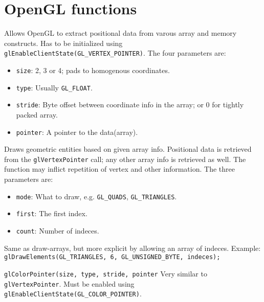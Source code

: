 \documentclass[a4paper, english, 12pt]{article}
\begin{document}


\section{OpenGL functions}
\label{sec:functions}

\begin{description}
	\item[\texttt{glVertexPointer(size, type, stride, pointer)}] Allows OpenGL to extract positional data from varous array and memory constructs. Has to be initialized using \texttt{glEnableClientState(GL\_VERTEX\_POINTER)}. The four parameters are:
	 \begin{itemize}[noitemsep]
		\item \texttt{size}: 2, 3 or 4; pads to homogenous coordinates.
		\item \texttt{type}: Usually \texttt{GL\_FLOAT}.
		\item \texttt{stride}: Byte offset between coordinate info in the array; or 0 for tightly packed array.
		\item \texttt{pointer}: A pointer to the data(array).
	\end{itemize}
	
	\item[\texttt{glDrawArrays(mode, first, count}] Draws geometric entities based on given array info. Positional data is retrieved from the \texttt{glVertexPointer} call; any other array info is retrieved as well. The function may inflict repetition of vertex and other information. The three parameters are:
	\begin{itemize}[noitemsep]
		\item \texttt{mode}: What to draw, e.g. \texttt{GL\_QUADS}, \texttt{GL\_TRIANGLES}.
		\item \texttt{first}: The first index.
		\item \texttt{count}: Number of indeces.
	\end{itemize}
	
	\item [\texttt{glDrawElements(mode, count, type, indeces}] Same as draw-arrays, but more explicit by allowing an array of indeces. Example: \texttt{glDrawElements(GL\_TRIANGLES, 6, GL\_UNSIGNED\_BYTE, indeces);}
	
	\item \texttt{glColorPointer(size, type, stride, pointer} Very similar to \texttt{glVertexPointer}. Must be enabled using \texttt{glEnableClientState(GL\_COLOR\_POINTER)}.
\end{description}

\end{document}
